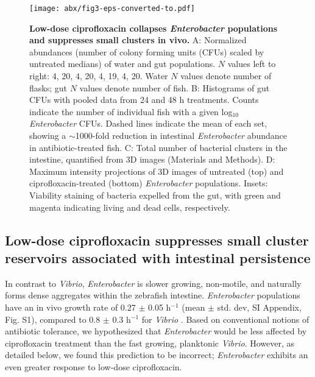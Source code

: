 \begin{figure*}[h]
\centerline{
	\texttt{[image: abx/fig3-eps-converted-to.pdf]}}
	\caption{\textbf{Low-dose ciprofloxacin collapses \textit{Enterobacter} populations and suppresses small clusters in vivo.} A: Normalized abundances (number of colony forming units (CFUs) scaled by untreated medians) of water and gut populations. $N$ values left to right: 4, 20, 4, 20, 4, 19, 4, 20. Water $N$ values denote number of flasks; gut $N$ values denote number of fish. B: Histograms of gut CFUs with pooled data from 24 and 48 h treatments. Counts indicate the number of individual fish with a given log$_{10}$ \textit{Enterobacter} CFUs. Dashed lines indicate the mean of each set, showing a $\sim$1000-fold reduction in intestinal \textit{Enterobacter} abundance in antibiotic-treated fish. C: Total number of bacterial clusters in the intestine, quantified from 3D images (Materials and Methods). D: Maximum intensity projections of 3D images of untreated (top) and ciprofloxacin-treated (bottom) \textit{Enterobacter} populations. Insets: Viability staining of bacteria expelled from the gut, with green and magenta indicating living and dead cells, respectively.}
\end{figure*}


 \subsection{Low-dose ciprofloxacin suppresses small cluster reservoirs associated with intestinal persistence}

In contrast to \textit{Vibrio}, \textit{Enterobacter} is slower growing, non-motile, and naturally forms dense aggregates within the zebrafish intestine. \textit{Enterobacter} populations have an in vivo growth rate of 0.27 $\pm$ 0.05 h$^{-1}$ (mean $\pm$ std. dev, SI Appendix, Fig. S1), compared to 0.8 $\pm$ 0.3 h$^{-1}$ for \textit{Vibrio} \cite{Wiles2016}. Based on conventional notions of antibiotic tolerance, we hypothesized that \textit{Enterobacter} would be less affected by ciprofloxacin treatment than the fast growing, planktonic \textit{Vibrio}. However, as detailed below, we found this prediction to be incorrect; \textit{Enterobacter} exhibits an even greater response  to low-dose ciprofloxacin.

